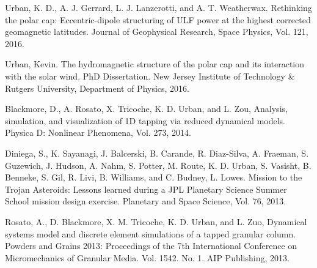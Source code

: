\begin{itemize*}


  \item \label{itm:sw-2016-eccentric}
    Urban, K. D., A. J. Gerrard, L. J. Lanzerotti, and A. T. Weatherwax.
    Rethinking the polar cap: Eccentric-dipole structuring of ULF power at the highest corrected geomagnetic latitudes.
    Journal of Geophysical Research, Space Physics, Vol. 121, 2016.

  \item \label{itm:sw-2016-phd} 
    Urban, Kevin.
    The hydromagnetic structure of the polar cap and its interaction
    with the solar wind.  PhD Dissertation. 
    New Jersey Institute of Technology \& Rutgers University, 
    Department of Physics, 2016.
    

  \item \label{itm:gran-2014-reduced}
    Blackmore, D., A. Rosato, X. Tricoche, K. D. Urban, and L. Zou,
    Analysis, simulation, and visualization of 1D tapping via reduced dynamical models.
    Physica D: Nonlinear Phenomena, Vol.  273, 2014.

  \item \label{psss-2013-trojan}
    Diniega, S., K. Sayanagi, J. Balcerski, B. Carande, R. Diaz-Silva,
    A. Fraeman, S. Guzewich, J. Hudson, A. Nahm, S. Potter, M. Route, K.
    D. Urban, S. Vasisht, B. Benneke, S. Gil, R. Livi, B. Williams, and C.
    Budney, L. Lowes.
    Mission to the Trojan Asteroids: Lessons learned during a JPL Planetary Science Summer School mission design exercise.
    Planetary and Space Science, Vol. 76, 2013.

  \item \label{itm:gran-2013-simulations}
    Rosato, A., D. Blackmore, X. M. Tricoche, K. D. Urban, and L. Zuo,
    Dynamical systems model and discrete element simulations of a tapped granular column.
    Powders and Grains 2013: Proceedings of the 7th International Conference 
    on Micromechanics of Granular Media. Vol. 1542. No. 1. AIP Publishing, 2013.


\end{itemize*}
